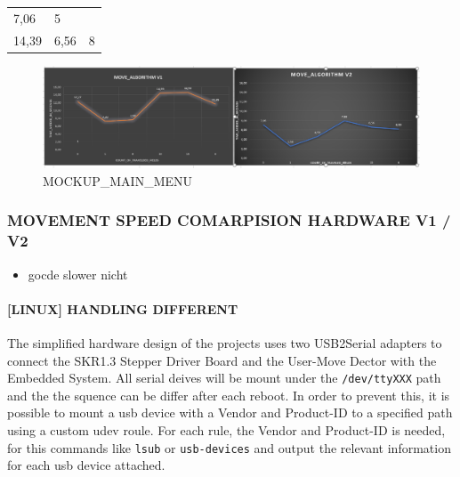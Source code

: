 \begin{longtable}[]{@{}lll@{}}
\begin{minipage}[t]{0.29\columnwidth}
7,06\strut
\end{minipage} & \begin{minipage}[t]{0.34\columnwidth}\raggedright
5\strut
\end{minipage}\tabularnewline
\begin{minipage}[t]{0.29\columnwidth}\raggedright
14,39\strut
\end{minipage} & \begin{minipage}[t]{0.29\columnwidth}\raggedright
6,56\strut
\end{minipage} & \begin{minipage}[t]{0.34\columnwidth}\raggedright
8\strut
\end{minipage}\tabularnewline
\bottomrule
\end{longtable}

\begin{figure}
\centering
\includegraphics{./images/FigureMovementTims_GRAPH_COMP.PNG}
\caption{MOCKUP\_MAIN\_MENU}
\end{figure}

\hypertarget{movement-speed-comarpision-hardware-v1-v2}{%
\subsubsection{MOVEMENT SPEED COMARPISION HARDWARE V1 /
V2}\label{movement-speed-comarpision-hardware-v1-v2}}

\begin{itemize}
\tightlist
\item
  gocde slower nicht
\end{itemize}

\hypertarget{linux-handling-different}{%
\paragraph{{[}LINUX{]} HANDLING
DIFFERENT}\label{linux-handling-different}}

The simplified hardware design of the projects uses two USB2Serial
adapters to connect the SKR1.3 Stepper Driver Board and the User-Move
Dector with the Embedded System. All serial deives will be mount under
the \passthrough{\lstinline!/dev/ttyXXX!} path and the the squence can
be differ after each reboot. In order to prevent this, it is possible to
mount a usb device with a Vendor and Product-ID to a specified path
using a custom udev roule. For each rule, the Vendor and Product-ID is
needed, for this commands like \passthrough{\lstinline!lsub!} or
\passthrough{\lstinline!usb-devices!} and output the relevant
information for each usb device attached.

